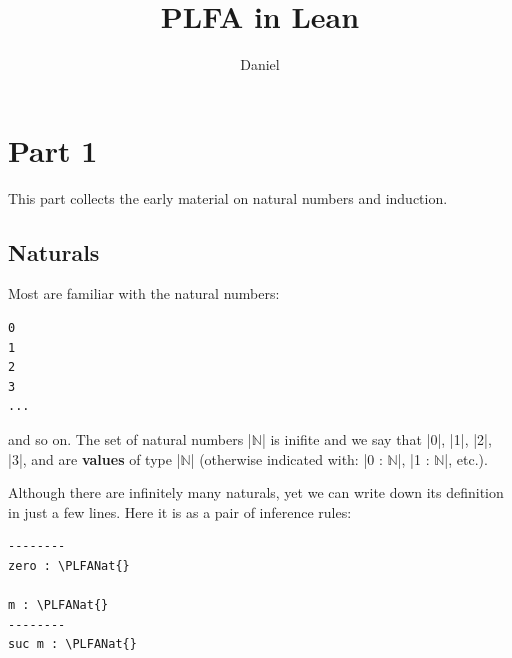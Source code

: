 \documentclass{memoir}
\title{\sffamily PLFA in Lean}
\author{\sffamily Daniel}
\date{\sffamily }
\newcommand{\PLFANat}{\ensuremath{\mathbb{N}}}
\let\cleardoublepage\clearpage
\begin{document}
\frontmatter

\begin{titlingpage}
\maketitle
\end{titlingpage}

\tableofcontents

\par

\cleardoublepage
\clearpage

\par

\mainmatter
\chapter{Part 1}\label{PLFA--in--Lean----Part--1}

\par
This part collects the early material on natural numbers and induction.

\par

\section{Naturals}\label{PLFA--in--Lean----Part--1----Naturals}

\par
Most are familiar with the natural numbers:

\par
\begin{verbatim}
0
1
2
3
...
\end{verbatim}

\par
\par\noindent and so on. The set of natural numbers \LeanVerb|\PLFANat{}| is inifite and we say that \LeanVerb|0|, \LeanVerb|1|,
\LeanVerb|2|, \LeanVerb|3|, and are \textbf{values} of type \LeanVerb|\PLFANat{}| (otherwise indicated with: \LeanVerb|0 : \PLFANat{}|,
\LeanVerb|1 : \PLFANat{}|,  etc.).

\par
Although there are infinitely many naturals, yet we can write down its
definition in just a few lines. Here it is as a pair of inference rules:

\par
\begin{verbatim}
--------
zero : \PLFANat{}

m : \PLFANat{}
--------
suc m : \PLFANat{}
\end{verbatim}
\end{document}
